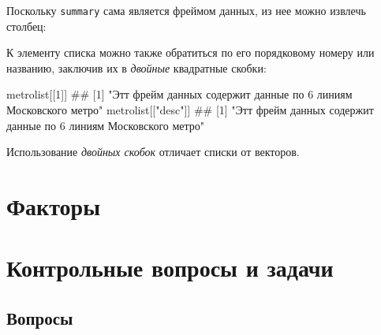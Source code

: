 \documentclass[]{book}
\newenvironment{Shaded}{\begin{snugshade}}{\end{snugshade}}
\newcommand{\DecValTok}[1]{\textcolor[rgb]{0.00,0.00,0.81}{#1}}
\newcommand{\StringTok}[1]{\textcolor[rgb]{0.31,0.60,0.02}{#1}}
\newcommand{\OperatorTok}[1]{\textcolor[rgb]{0.81,0.36,0.00}{\textbf{#1}}}
\newcommand{\NormalTok}[1]{#1}
\begin{document}
Поскольку \texttt{summary} сама является фреймом данных, из нее можно
извлечь столбец:

\begin{Shaded}
\end{Shaded}

К элементу списка можно также обратиться по его порядковому номеру или
названию, заключив их в \emph{двойные} квадратные скобки:

\begin{Shaded}
\begin{Highlighting}[]
\NormalTok{metrolist[[}\DecValTok{1}\NormalTok{]]}
\NormalTok{## [1] "Этт фрейм данных содержит данные по 6 линиям Московского метро"}
\NormalTok{metrolist[[}\StringTok{"desc"}\NormalTok{]]}
\NormalTok{## [1] "Этт фрейм данных содержит данные по 6 линиям Московского метро"}
\end{Highlighting}
\end{Shaded}

Использование \emph{двойных скобок} отличает списки от векторов.

\section{Факторы}

\section{Контрольные вопросы и задачи}\label{questions_tasks_vectors}

\subsection{Вопросы}\label{questions_vectors}
\end{document}
